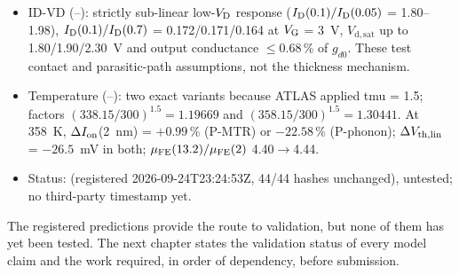 \begin{keyresult}[title={Key result: registered predictions}]
\begin{itemize}
  \item ID-VD (--): strictly sub-linear low-$V_{\mathrm{D}}$ response ($I_{\mathrm{D}}(0.1)/I_{\mathrm{D}}(0.05)$ = 1.80--1.98), $I_{\mathrm{D}}(0.1)/I_{\mathrm{D}}(0.7)$ = 0.172/0.171/0.164 at $V_{\mathrm{G}}$ = 3~V, $V_{\mathrm{d,sat}}$ up to 1.80/1.90/2.30~V and output conductance $\le0.68$\,\% of $g_{d0}$. These test contact and parasitic-path assumptions, not the thickness mechanism.
  \item Temperature (--): two exact variants because ATLAS applied tmu = 1.5; factors $(338.15/300)^{1.5} = 1.19669$ and $(358.15/300)^{1.5} = 1.30441$. At 358~K, $\Delta I_{\mathrm{on}}$(2~nm) = $+0.99$\,\% (P-MTR) or $-22.58$\,\% (P-phonon); $\Delta V_{\mathrm{th,lin}}$ = $-26.5$~mV in both; $\mu_{\mathrm{FE}}(13.2)/\mu_{\mathrm{FE}}(2)$ 4.40$\rightarrow$4.44.
  \item Status: \evPRED{} (registered 2026-09-24T23:24:53Z, 44/44 hashes unchanged), untested; no third-party timestamp yet.
\end{itemize}
\end{keyresult}

The registered predictions provide the route to validation, but none of them has yet been tested. The next chapter states the validation status of every model claim and the work required, in order of dependency, before submission.
